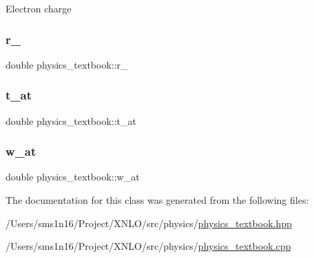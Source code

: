 Electron charge \mbox{\label{classphysics__textbook_ac429976f0dc885d846d8b31c24f45bd6}} 
\subsubsection{\texorpdfstring{r\+\_}{r\_0}}
{\footnotesize\ttfamily double physics\+\_\+textbook\+::r\+\_}

\mbox{\label{classphysics__textbook_acdcf772ff70c544f8394b3a9fc57674c}} 
\subsubsection{\texorpdfstring{t\+\_\+at}{t\_at}}
{\footnotesize\ttfamily double physics\+\_\+textbook\+::t\+\_\+at}

\mbox{\label{classphysics__textbook_a63250c79f053fa4aa1c8f3505971b4f1}} 
\subsubsection{\texorpdfstring{w\+\_\+at}{w\_at}}
{\footnotesize\ttfamily double physics\+\_\+textbook\+::w\+\_\+at}



The documentation for this class was generated from the following files\+:\begin{DoxyCompactItemize}
\item 
/\+Users/sms1n16/\+Project/\+X\+N\+L\+O/src/physics/\hyperlink{physics__textbook_8hpp}{physics\+\_\+textbook.\+hpp}\item 
/\+Users/sms1n16/\+Project/\+X\+N\+L\+O/src/physics/\hyperlink{physics__textbook_8cpp}{physics\+\_\+textbook.\+cpp}\end{DoxyCompactItemize}
